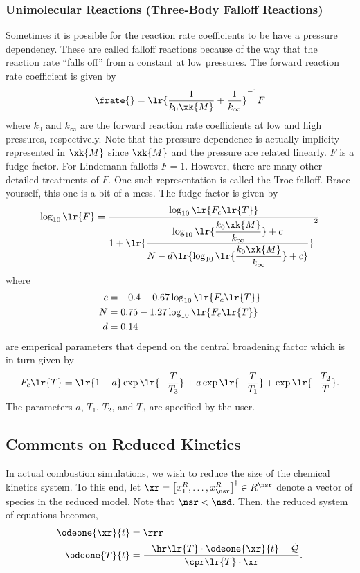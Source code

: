 \subsubsection{Unimolecular Reactions (Three-Body Falloff Reactions)}
Sometimes it is possible for the reaction rate coefficients to be 
have a pressure dependency.  These are called falloff reactions 
because of the way that the reaction rate ``falls off'' from a 
constant at low pressures.  The forward reaction rate coefficient 
is given by 
\begin{align}
  \frate{} = \lr{\frac{1}{k_{0}\xk{M}} + \frac{1}{k_{\infty}}}^{-1}F
\end{align}
where $k_{0}$ and $k_{\infty}$ are the forward reaction rate 
coefficients at low and high pressures, respectively.  Note that 
the pressure dependence is actually implicity represented in $\xk{M}$ 
since $\xk{M}$ and the pressure are related linearly.  $F$ is 
a fudge factor.  For Lindemann falloffs $F = 1$. 
However, there are many other detailed treatments of $F$.  One 
such representation is called the Troe falloff.  Brace yourself, 
this one is a bit of a mess.  The fudge factor is 
given by
\begin{align}
  \log_{10}\lr{F} = \frac{\displaystyle \log_{10}\lr{F_{c}\lr{T}}}
    {\displaystyle 1 + \lr{\frac{\displaystyle\log_{10}\lr{\frac{k_{0}\xk{M}}{k_{\infty}}} + c}{\displaystyle N - d\lr{\log_{10}\lr{\frac{k_{0}\xk{M}}{k_{\infty}}} + c}}}^{2}}
\end{align}
where 
\begin{align}
  c &= -0.4 - 0.67\log_{10}\lr{F_{c}\lr{T}} \\
  N &= 0.75 - 1.27\log_{10}\lr{F_{c}\lr{T}} \\
  d &= 0.14
\end{align}
are emperical parameters that depend on the central broadening factor which 
is in turn given by 
\begin{align}
  F_{c}\lr{T} = \lr{1-a}\exp\lr{-\frac{T}{T_{3}}} + 
                      a \exp\lr{-\frac{T}{T_{1}}} + 
                        \exp\lr{-\frac{T_{2}}{T}}.
\end{align}
The parameters $a$, $T_{1}$, $T_{2}$, and $T_{3}$ are specified by the 
user.

\subsection{Comments on Reduced Kinetics}
In actual combustion simulations, we wish to reduce the size of the chemical kinetics system.  
To this end, let $\xr = \left[x_{1}^{R}, \ldots, x_{\nsr}^{R}\right]^{\dagger} \in R^{\nsr}$ 
denote a vector of species in the reduced model.  Note that $\nsr < \nsd$.  Then, the reduced 
system of equations becomes,
\begin{align}
  \odeone{\xr}{t} &= \rrr \label{eq:reduced}\\
  \odeone{T}{t}   &= \frac{\displaystyle -\hr\lr{T}\cdot\odeone{\xr}{t} + \dot{\mathcal{Q}}}{\displaystyle \cpr\lr{T}\cdot\xr}. \label{eq:reduced_T}
\end{align}

